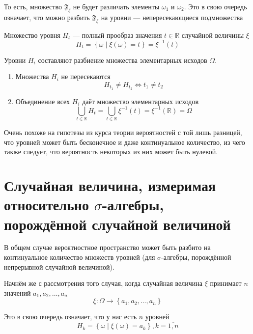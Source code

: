 То есть, множество $\mathfrak{F}_\xi$ не будет различать
элементы $\omega_1$ и $\omega_2$.
Это в свою очередь означает, что можно разбить $\mathfrak{F}_\xi$
на уровни --- непересекающиеся подмножества

\begin{definition}
    Множество уровня $H_t$ --- полный прообраз
    значения $t\in\mathbb{R}$ случайной величины $\xi$
    $$H_t
        = \left\{ \omega \mid \xi\left( \omega \right) = t \right\}
        = \xi^{-1}\left( t \right)$$
\end{definition}

\begin{remark}
    Уровни $H_i$ составляют разбиение множества элементарных исходов $\Omega$.
    \begin{enumerate}
        \item Множества $H_i$ не пересекаются
            $$H_{t_1} \neq H_{t_2} \Leftrightarrow t_1 \neq t_2$$
        \item Объединение всех $H_i$ даёт множество элементарных исходов
            $$\bigcup_{t \in \mathbb{R}} H_t
                = \bigcup_{t \in \mathbb{R}} \xi^{-1}\left( t \right)
                = \xi^{-1}\left( \mathbb{R} \right)
                = \Omega$$
    \end{enumerate}
\end{remark}

Очень похоже на гипотезы из курса теории вероятностей с той лишь разницей,
что уровней может быть бесконечное и даже континуальное количество,
из чего также следует, что вероятность некоторых из них может быть нулевой.

\section{Случайная величина, измеримая относительно $\sigma$-алгебры,
    порождённой случайной величиной}
В общем случае вероятностное пространство может быть разбито
на континуальное количество множеств уровней
(для $\sigma$-алгебры, порождённой непрерывной случайной величиной).

Начнём же с рассмотрения того случая,
когда случайная величина $\xi$ принимает $n$ значений
$a_1, a_2, \dots, a_n$
$$\xi: \Omega \rightarrow \left\{ a_1, a_2, \dots, a_n \right\}$$

Это в свою очередь означает, что у нас есть $n$ уровней
$$H_k = \left\{ \omega \mid \xi\left( \omega \right) = a_k \right\},
    k=\overline{1,n}$$

